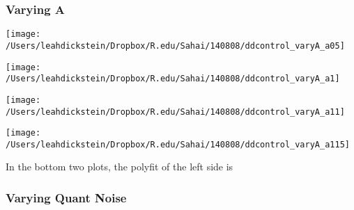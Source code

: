 \documentclass[leqno,twocolumn]{article}
\begin{document}
\subsubsection{Varying A}

\begin{minipage}[c]{0.5\textwidth}
\texttt{[image: /Users/leahdickstein/Dropbox/R.edu/Sahai/140808/ddcontrol\_varyA\_a05]}
\end{minipage}
\begin{minipage}[c]{0.5\textwidth}
\texttt{[image: /Users/leahdickstein/Dropbox/R.edu/Sahai/140808/ddcontrol\_varyA\_a1]}
\end{minipage}

\begin{minipage}[c]{0.5\textwidth}
\texttt{[image: /Users/leahdickstein/Dropbox/R.edu/Sahai/140808/ddcontrol\_varyA\_a11]}
\end{minipage}
\begin{minipage}[c]{0.5\textwidth}
\texttt{[image: /Users/leahdickstein/Dropbox/R.edu/Sahai/140808/ddcontrol\_varyA\_a115]}
\end{minipage}

In the bottom two plots, the polyfit of the left side is

\subsubsection{Varying Quant Noise}
\end{document}
